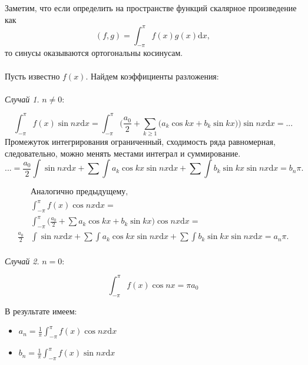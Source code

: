 \documentclass[12pt]{article}
\newcommand{\dd}{\ensuremath{\mathrm{d}}}
\begin{document}
Заметим, что если определить на пространстве функций скалярное произведение как $$(f, g) = \int_{-\pi}^{\pi} f(x) g(x) \mathrm{d}x, $$ то синусы оказываются ортогональны косинусам. 

\paragraph{}

Пусть известно $f(x)$. Найдем коэффициенты разложения:

\paragraph{}

\textit{Случай 1.} $n \ne 0$:

$$\int_{-\pi}^{\pi} f(x) \sin{nx} \mathrm{d}x = \int_{-\pi}^{\pi}\big( \frac{a_0}{2} + \sum_{k \geq 1} \big( a_k\cos{kx} + b_k \sin{kx} \big) \big) \sin{nx} \mathrm{d}x = ...$$
Промежуток интегрирования ограниченный, сходимость ряда равномерная, следовательно, можно менять местами интеграл и суммирование.
$$... = \frac{a_0}{2} \int \sin{nx} \dd x + \sum \int a_k\cos{kx}\sin{nx}\dd x + \sum \int b_k\sin{kx}\sin{nx}\dd x = b_n\pi .$$


\begin{align*}
    & \text{Аналогично предыдущему}, \\
    & \int_{-\pi}^{\pi} f(x) \cos{nx}\dd x = \\ & \int_{-\pi}^{\pi}\big(\frac{a_0}{2} + \sum a_k\cos{kx} + b_k\sin{kx}\big)\cos{nx}\dd x = \\  
    \frac{a_0}{2}&\int\sin{nx}\dd x + \sum\int a_k\cos{kx}\sin{nx}\dd x + \sum\int b_k\sin{kx}\sin{nx}\dd x = a_n\pi.
\end{align*}

\paragraph{}

\textit{Случай 2.} $n = 0$:

$$\int_{-\pi}^{\pi} f(x) \cos{nx} = \pi a_0 $$



В результате имеем: 
\begin{itemize}
    \item $a_n = \frac{1}{\pi} \int_{-\pi}^{\pi} f(x) \cos{nx} \dd x $
    \item $b_n = \frac{1}{\pi} \int_{-\pi}^{\pi} f(x) \sin{nx} \dd x $
\end{itemize}
\end{document}
